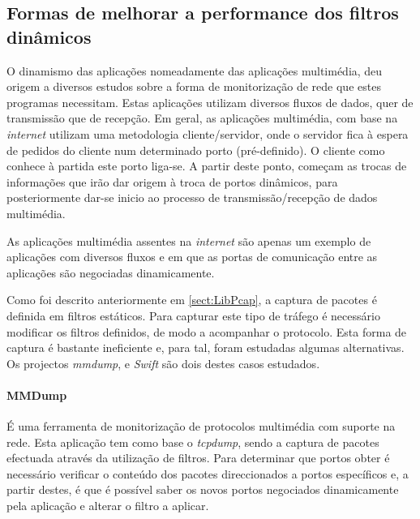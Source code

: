 

\subsection{Formas de melhorar a performance dos filtros dinâmicos}
 O dinamismo das aplicações nomeadamente das aplicações multimédia, deu origem a diversos estudos sobre a forma de monitorização de rede que estes programas necessitam.
Estas aplicações utilizam diversos fluxos de dados, quer de transmissão que de recepção. Em geral, as aplicações multimédia, com base na \textit{internet} utilizam uma metodologia cliente/servidor, onde o servidor fica à espera de pedidos do cliente num determinado porto (pré-definido). O cliente como conhece à partida este porto liga-se. A partir deste ponto, começam as trocas de informações que irão dar origem à troca de portos dinâmicos, para posteriormente dar-se inicio ao processo de transmissão/recepção de dados multimédia.

As aplicações multimédia assentes na \textit{internet} são apenas um exemplo de aplicações com diversos fluxos e em que as portas de comunicação entre as aplicações são negociadas dinamicamente.

Como foi descrito anteriormente em \ref{sect:LibPcap}, a captura de pacotes é definida em filtros estáticos.
Para capturar este tipo de tráfego é necessário modificar os filtros definidos, de modo a acompanhar o protocolo.
Esta forma de captura é bastante ineficiente e, para tal, foram estudadas algumas alternativas. Os projectos \textit{mmdump}\cite{505678}, %
e \textit{Swift}\cite{1387609} são dois destes casos estudados.

\paragraph*{MMDump} É uma ferramenta de monitorização de protocolos multimédia com suporte na rede.
Esta aplicação tem como base o \textit{tcpdump}, sendo a captura de pacotes efectuada através da utilização de filtros.
Para determinar que portos obter é necessário verificar o conteúdo dos pacotes direccionados a portos específicos e, a partir destes, é que é possível saber os novos portos negociados dinamicamente pela aplicação e alterar o filtro a aplicar. 

